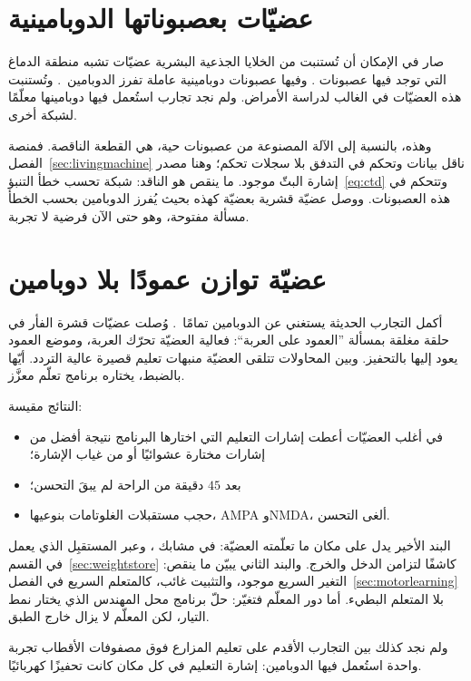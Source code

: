 \section{عضيّات بعصبوناتها الدوبامينية}
\label{sec:midbrainorg}

صار في الإمكان أن تُستنبت من الخلايا الجذعية البشرية عضيّات تشبه منطقة الدماغ التي توجد فيها عصبونات . وفيها عصبونات دوبامينية عاملة تفرز الدوبامين~\cite{Jo2016}. وتُستنبت هذه العضيّات في الغالب لدراسة الأمراض. ولم نجد تجارب استُعمل فيها دوبامينها معلّمًا لشبكة أخرى.

وهذه، بالنسبة إلى الآلة المصنوعة من عصبونات حية، هي القطعة الناقصة. فمنصة الفصل~\ref{sec:livingmachine} ناقل بيانات وتحكم في التدفق بلا سجلات تحكم؛ وهنا مصدر إشارة البثّ موجود. ما ينقص هو الناقد: شبكة تحسب خطأ التنبؤ~\eqref{eq:ctd} وتتحكم في هذه العصبونات. ووصل عضيّة قشرية بعضيّة كهذه بحيث يُفرز الدوبامين بحسب الخطأ مسألة مفتوحة، وهو حتى الآن فرضية لا تجربة.

\section{عضيّة توازن عمودًا بلا دوبامين}
\label{sec:cartpole}

أكمل التجارب الحديثة يستغني عن الدوبامين تمامًا~\cite{Robbins2026}. وُصلت عضيّات قشرة الفأر في حلقة مغلقة بمسألة ”العمود على العربة“: فعالية العضيّة تحرّك العربة، وموضع العمود يعود إليها بالتحفيز. وبين المحاولات تتلقى العضيّة منبهات تعليم قصيرة عالية التردد. أيّها بالضبط، يختاره برنامج تعلّم معزَّز.

النتائج مقيسة:
\begin{itemize}
\item في أغلب العضيّات أعطت إشارات التعليم التي اختارها البرنامج نتيجة أفضل من إشارات مختارة عشوائيًا أو من غياب الإشارة؛
\item بعد $45$ دقيقة من الراحة لم يبقَ التحسن؛
\item حجب مستقبلات الغلوتامات بنوعيها، \foreignlanguage{english}{AMPA} و\foreignlanguage{english}{NMDA}، ألغى التحسن.
\end{itemize}

البند الأخير يدل على مكان ما تعلّمته العضيّة: في مشابك ، وعبر المستقبِل الذي يعمل في القسم~\ref{sec:weightstore} كاشفًا لتزامن الدخل والخرج. والبند الثاني يبيّن ما ينقص: التغير السريع موجود، والتثبيت غائب، كالمتعلم السريع في الفصل~\ref{sec:motorlearning} بلا المتعلم البطيء. أما دور المعلّم فتغيّر: حلّ برنامج محل المهندس الذي يختار نمط التيار، لكن المعلّم لا يزال خارج الطبق.

ولم نجد كذلك بين التجارب الأقدم على تعليم المزارع فوق مصفوفات الأقطاب تجربة واحدة استُعمل فيها الدوبامين: إشارة التعليم في كل مكان كانت تحفيزًا كهربائيًا.

